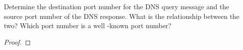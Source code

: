 \documentclass[../../main.tex]{subfiles}
\begin{document}
\begin{wts}
Determine the destination port number for the DNS query message and the source port number of the DNS response.  What is the relationship between the two? Which port number is a well -known port number?
\end{wts}
\begin{proof}

\end{proof}
\end{document}
